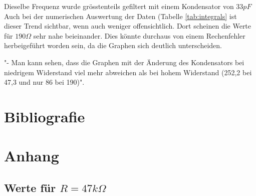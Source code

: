\documentclass{article}
\begin{document}
Dieselbe Frequenz wurde grösstenteils gefiltert mit einem Kondensator von $33pF$
Auch bei der numerischen Auswertung der Daten (Tabelle \ref{tab:integrals} ist dieser Trend sichtbar, wenn auch weniger offensichtlich. Dort scheinen die Werte für $190\Omega$ sehr nahe beieinander. Dies könnte durchaus von einem Rechenfehler herbeigeführt worden sein, da die Graphen sich deutlich unterscheiden.


 "-	Man kann sehen, dass die Graphen mit der Änderung des Kondensators bei niedrigem Widerstand viel mehr abweichen als bei hohem Widerstand (252,2 bei 47,3 und nur 86 bei 190)".
\newpage
\section{Bibliografie}
\printbibliography{} %

\section{Anhang}

\newpage
\subsection{Werte für $R = 47k\Omega$}
\end{document}
